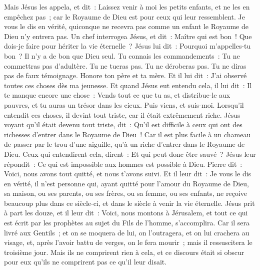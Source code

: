 \begin{multicols}{2}
Mais Jésus les appela, et dit~: Laissez venir à moi les petits enfants, et ne les en empêchez pas~; car le Royaume de Dieu est pour ceux qui leur ressemblent.
Je vous le dis en vérité, quiconque ne recevra pas comme un enfant le Royaume de Dieu n'y entrera pas.
Un chef interrogea Jésus, et dit~: Maître qui est bon~! Que dois-je faire pour hériter la vie éternelle~?
Jésus lui dit~: Pourquoi m'appelles-tu bon~? Il n'y a de bon que Dieu seul.
Tu connais les commandements~: Tu ne commettras pas d'adultère. Tu ne tueras pas. Tu ne déroberas pas. Tu ne diras pas de faux témoignage. Honore ton père et ta mère.
Et il lui dit~: J'ai observé toutes ces choses dès ma jeunesse.
Et quand Jésus eut entendu cela, il lui dit~: Il te manque encore une chose~: Vends tout ce que tu as, et distribue-le aux pauvres, et tu auras un trésor dans les cieux. Puis viens, et suis-moi.
Lorsqu'il entendit ces choses, il devint tout triste, car il était extrêmement riche.
Jésus voyant qu'il était devenu tout triste, dit~: Qu'il est difficile à ceux qui ont des richesses d'entrer dans le Royaume de Dieu~!
Car il est plus facile à un chameau de passer par le trou d'une aiguille, qu'à un riche d'entrer dans le Royaume de Dieu.
Ceux qui entendirent cela, dirent~: Et qui peut donc être sauvé~?
Jésus leur répondit~: Ce qui est impossible aux hommes est possible à Dieu.
Pierre dit~: Voici, nous avons tout quitté, et nous t'avons suivi.
Et il leur dit~: Je vous le dis en vérité, il n'est personne qui, ayant quitté pour l'amour du Royaume de Dieu, sa maison, ou ses parents, ou ses frères, ou sa femme, ou ses enfants,
ne reçoive beaucoup plus dans ce siècle-ci, et dans le siècle à venir la vie éternelle.
Jésus prit à part les douze, et il leur dit~: Voici, nous montons à Jérusalem, et tout ce qui est écrit par les prophètes au sujet du Fils de l'homme, s'accomplira.
Car il sera livré aux Gentils~; et on se moquera de lui, on l'outragera, et on lui crachera au visage,
et, après l'avoir battu de verges, on le fera mourir~; mais il ressuscitera le troisième jour.
Mais ils ne comprirent rien à cela, et ce discours était si obscur pour eux qu'ils ne comprirent pas ce qu'il leur disait.

\end{multicols}
